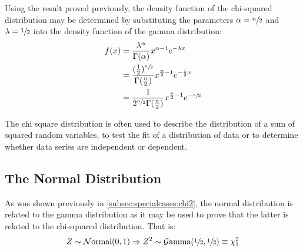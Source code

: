 \documentclass[12pt]{article}
\newcommand{\G}{\mathcal{G}}
\newcommand{\N}{\mathcal{N}}
\begin{document}
Using the result proved previously, the density function of the chi-squared distribution may be determined by
substituting the parameters $\alpha = \sfrac{n}{2}$ and $\lambda = \sfrac{1}{2}$ into the density function of the gamma
distribution:
\begin{equation}\label{eq:chisquared-density}
	\begin{split}
		f(x)	&=	\frac{\lambda^\alpha}{\Gamma(\alpha)}x^{\alpha-1}e^{-\lambda x}\\
				&=	\frac{(\frac{1}{2})^{\sfrac{n}{2}}}{\Gamma(\frac{n}{2})}x^{\frac{n}{2}-1}e^{-\frac{1}{2}x}\\
				&=	\frac{1}{2^{\sfrac{n}{2}}\Gamma(\frac{n}{2})}x^{\frac{n}{2}-1}e^{-\sfrac{x}{2}}
	\end{split}
\end{equation}

The chi square distribution is often used to describe the distribution of a sum of squared random variables, to test the
fit of a distribution of data or to determine whether data series are independent or dependent.


\pagebreak
\subsection{The Normal Distribution}\label{subsec:specialcases:normal}
As was shown previously in \autoref{subsec:specialcases:chi2}, the normal distribution is related to the gamma
distribution as it may be used to prove that the latter is related to the chi-squared distribution. That is:
\begin{equation}
	Z\sim\N\text{ormal}(0, 1)\Rightarrow Z^2\sim\G\text{amma}(\sfrac{1}{2}, \sfrac{1}{2})\equiv\chi^2_1
\end{equation}
\end{document}
